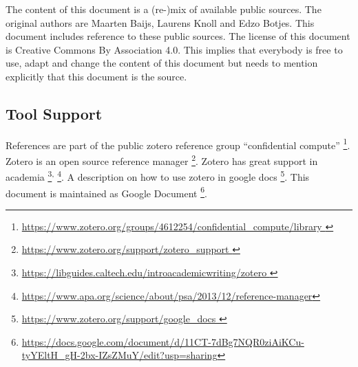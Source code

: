 The content of this document is a (re-)mix of available public sources. The original authors are Maarten Baijs, Laurens Knoll and Edzo Botjes. This document includes reference to these public sources. The license of this document is Creative Commons By Association 4.0. This implies that everybody is free to use, adapt and change the content of this document but needs to mention explicitly that this document is the source.

\subsection{Tool Support}

References are part of the public zotero reference group  “confidential compute”
\footnote{\url{https://www.zotero.org/groups/4612254/confidential_compute/library }}.
Zotero is an open source reference manager
\footnote{\url{https://www.zotero.org/support/zotero_support }}.
Zotero has great support in academia
\footnote{\url{https://libguides.caltech.edu/introacademicwriting/zotero }}\textsuperscript{,}
\footnote{\url{https://www.apa.org/science/about/psa/2013/12/reference-manager}}.
A description on how to use zotero in google docs 
\footnote{\url{https://www.zotero.org/support/google_docs }}.
This document is maintained as Google Document
\footnote{\url{https://docs.google.com/document/d/11CT-7dBg7NQR0ziAiKCu-tyYEltH_gH-2bx-IZsZMuY/edit?usp=sharing}}.


